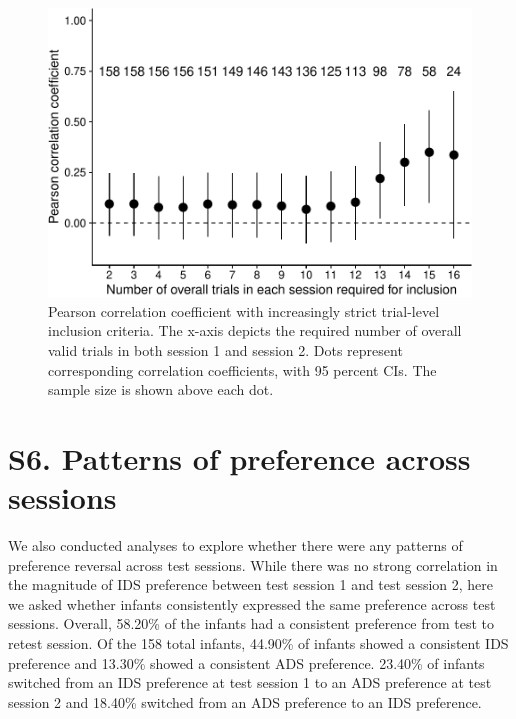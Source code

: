 \documentclass[
  man, donotrepeattitle,floatsintext]{apa6}
\begin{document}
\begin{figure}
\centering
\includegraphics{MB1T_supplement_files/figure-latex/sfig5-1.pdf}
\caption{\label{fig:sfig5}Pearson correlation coefficient with increasingly strict trial-level inclusion criteria. The x-axis depicts the required number of overall valid trials in both session 1 and session 2. Dots represent corresponding correlation coefficients, with 95 percent CIs. The sample size is shown above each dot.}
\end{figure}

\newpage

\hypertarget{s6.-patterns-of-preference-across-sessions}{%
\section{S6. Patterns of preference across sessions}\label{s6.-patterns-of-preference-across-sessions}}

We also conducted analyses to explore whether there were any patterns of preference reversal across test sessions.
While there was no strong correlation in the magnitude of IDS preference between test session 1 and test session 2, here we asked whether infants consistently expressed the same preference across test sessions.
Overall, 58.20\% of the infants had a consistent preference from test to retest session.
Of the 158 total infants, 44.90\% of infants showed a consistent IDS preference and 13.30\% showed a consistent ADS preference.
23.40\% of infants switched from an IDS preference at test session 1 to an ADS preference at test session 2 and 18.40\% switched from an ADS preference to an IDS preference.
\end{document}
